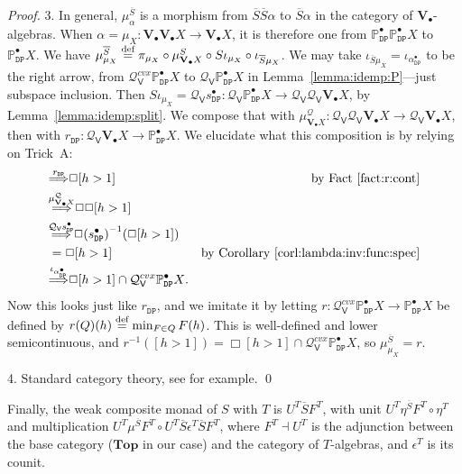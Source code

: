 \documentclass[preprint,12pt]{elsarticle}
\newcommand\eqdef{\mathrel{\buildrel \text{def}\over=}}
\newcommand\Pred{\mathbb{P}}
\newcommand\Demon{{\mathtt{D}}}
\newcommand\Nature{{\mathtt{P}}}
\newcommand\DN{{\Demon\Nature}}
\newcommand\invto[1]{{\buildrel {#1} \over\Longrightarrow}}
\newcommand\Smyth{{\mathcal Q}}
\newcommand\Vt{\mathsf{V}}
\newcommand\SV{\Smyth_{\Vt}}
\newcommand\Val{{\mathbf V}}
\newcommand\Topcat{\mathbf{Top}}
\begin{document}
\begin{proof}
  3. In general, $\mu^{\overline S}_\alpha$ is a morphism from
  $\overline S {\overline S \alpha}$ to $\overline S \alpha$ in the
  category of $\Val_\bullet$-algebras.  When
  $\alpha = \mu_X \colon \Val_\bullet {\Val_\bullet X} \to
  \Val_\bullet X$, it is therefore one from
  $\Pred_\DN^\bullet {\Pred_\DN^\bullet X}$ to $\Pred_\DN^\bullet X$.
  We have
  $\mu^{\overline S}_{\mu_X} \eqdef \pi_{\mu_X} \circ
  \mu^S_{\Val_\bullet X} \circ S \iota_{\mu_X} \circ \iota_{\overline
    S \mu_X}$.  We may take
  $\iota_{\overline S \mu_X} = \iota_{\alpha_\DN^\bullet}$ to be the
  right arrow, from $\SV^{cvx} {\Pred_\DN^\bullet X}$ to
  $\SV {\Pred_\DN^\bullet X}$ in Lemma~\ref{lemma:idemp:P}---just
  subspace inclusion.  Then
  $S \iota_{\mu_X} = \SV {s_\DN^\bullet} \colon \SV {\Pred_\DN^\bullet
    X} \to \SV {\SV {\Val_\bullet X}}$, by
  Lemma~\ref{lemma:idemp:split}.  We compose that with
  $\mu^\Smyth_{\Val_\bullet X} \colon \SV {\SV {\Val_\bullet X}} \to
  \SV {\Val_\bullet X}$, then with
  $r_\DN \colon \SV {\Val_\bullet X} \to \Pred_\DN^\bullet X$.
  We elucidate what this composition is by relying on Trick~A:
  \begin{align*}
    [h > 1]
    & \invto{r_\DN}
      \Box {[h > 1]}
    & \text{by Fact~\ref{fact:r:cont}} \\
    & \invto{\mu^\Smyth_{\Val_\bullet X}}
      \Box {\Box {[h > 1]}} \\
    & \invto{\SV {s_\DN^\bullet}}
      \Box {{(s_\DN^\bullet)}^{-1} (\Box {[h > 1]})} \\
    & = \Box {[h > 1]}
    & \text{by Corollary~\ref{corl:lambda:inv:func:spec}} \\
    & \invto{\iota_{\alpha_\DN^\bullet}}
      \Box {[h > 1]} \cap \SV^{cvx} {\Pred_\DN^\bullet X}.
  \end{align*}
  Now this looks just like $r_\DN$, and we imitate it by letting
  $r \colon \SV^{cvx} {\Pred_\DN^\bullet X} \to \Pred_\DN^\bullet X$
  be defined by $r (Q) (h) \eqdef \min_{F \in Q} F (h)$.  This is
  well-defined and lower semicontinuous, and
  $r^{-1} ([h > 1]) = \Box {[h > 1]} \cap \SV^{cvx} {\Pred_\DN^\bullet
    X}$, so $\mu^{\overline S}_{\mu_X} = r$.

  4. Standard category theory, see \cite[Chapter~VI, Section~2,
  Theorem~1]{McLane:cat:math} for example.  \qed
\end{proof}

Finally, the weak composite monad of $S$ with $T$ is
$U^T \overline S F^T$, with unit
$U^T \eta^{\overline S} F^T \circ \eta^T$ and multiplication
$U^T \mu^{\overline S} F^T \circ U^T \overline S \epsilon^T \overline
S F^T$, where $F^T \dashv U^T$ is the adjunction between the base
category ($\Topcat$ in our case) and the category of $T$-algebras, and
$\epsilon^T$ is its counit.
\end{document}
